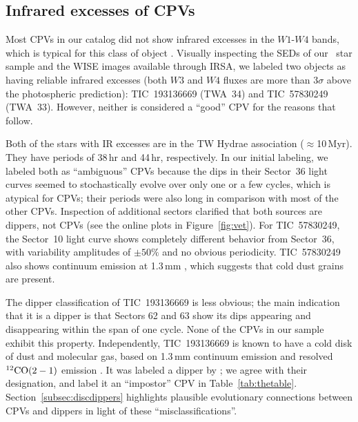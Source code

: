 \documentclass[11pt,twocolumn,tighten,linenumbers]{aastex63}
\begin{document}
\subsection{Infrared excesses of CPVs}
\label{subsec:irexcess}

Most CPVs in our catalog did not show infrared excesses in the
$W1$-$W4$ bands, which is typical for this class of object
\citep{2017AJ....153..152S}.  Visually inspecting the SEDs of our
\nallcands\ star sample and the WISE images available through IRSA, we
labeled two objects as having reliable infrared excesses (both $W3$
and $W4$ fluxes are more than 3$\sigma$ above the photospheric
prediction): TIC~193136669 (TWA~34) and TIC~57830249 (TWA~33).
However, neither is considered a ``good'' CPV for the reasons that
follow.

Both of the stars with IR excesses are in the TW Hydrae association
($\approx$10\,Myr).  They have periods of 38\,hr and 44\,hr,
respectively.  In our initial labeling, we labeled both as
``ambiguous'' CPVs because the dips in their Sector~36 light curves
seemed to stochastically evolve over only one or a few cycles, which
is atypical for CPVs; their periods were also long in comparison with
most of the other CPVs.  Inspection of additional sectors clarified
that both sources are dippers, not CPVs (see the online plots in
Figure~\ref{fig:vet}).  For TIC~57830249, the Sector~10 light curve
shows completely different behavior from Sector~36, with variability
amplitudes of $\pm 50\%$ and no obvious periodicity.  TIC~57830249
also shows continuum emission at 1.3\,mm \citep{2015A&A...582L...5R},
which suggests that cold dust grains are present.

The dipper classification of TIC~193136669 is less obvious; the main
indication that it is a dipper is that Sectors 62 and 63 show its dips
appearing and disappearing within the span of one cycle.  None of the
CPVs in our sample exhibit this property.  Independently,
TIC~193136669 is known to have a cold disk of dust and molecular gas,
based on 1.3\,mm continuum emission and resolved $^{12}{\rm CO}(2-1)$
emission \citep{2015A&A...582L...5R}.  It was labeled a dipper by
\citet{2022ApJS..263...14C}; we agree with their designation, and
label it an ``impostor'' CPV in Table~\ref{tab:thetable}.
Section~\ref{subsec:discdippers} highlights plausible evolutionary
connections between CPVs and dippers in light of these
``misclassifications''.
\end{document}
